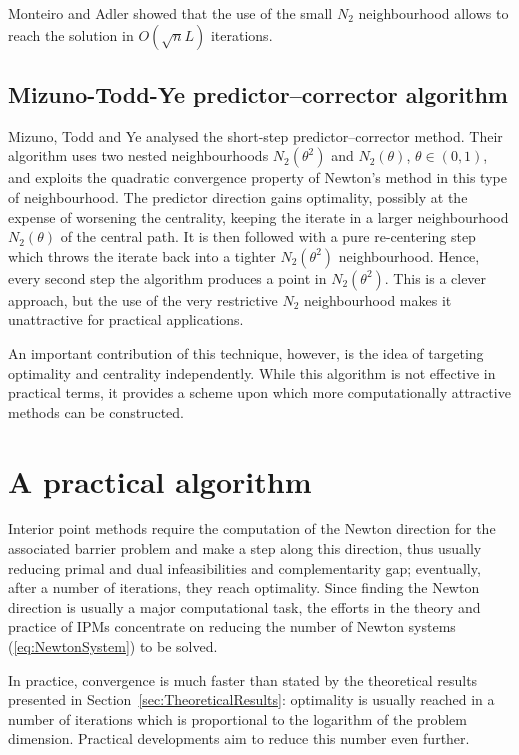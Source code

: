 Monteiro and Adler \cite{MonteiroAdler89a} showed that the use of
the small $N_2$ neighbourhood allows to reach the solution in
$O(\sqrt{n}L)$ iterations.


%
%
\subsection{Mizuno-Todd-Ye predictor--corrector algorithm}

Mizuno, Todd and Ye \cite{MizunoToddYe} analysed the short-step 
predictor--corrector method. Their algorithm uses two nested neighbourhoods 
$N_2(\theta^2)$ and $N_2(\theta)$, $\theta \in (0,1)$, and exploits the
quadratic convergence property of Newton's method in this type of 
neighbourhood.
The predictor direction gains optimality, possibly at the expense of
worsening the centrality, keeping the iterate in a larger neighbourhood
$N_2(\theta)$ of the central path. It is then followed with a 
pure re-centering step which throws the iterate back into a 
tighter $N_2(\theta^2)$ neighbourhood. Hence, every second step the 
algorithm produces a point in $N_2(\theta^2)$. This is a clever 
approach, but the use of the very restrictive $N_2$ neighbourhood 
makes it unattractive for practical applications.

An important contribution of this technique, however, is the idea 
of targeting optimality and centrality independently. While this 
algorithm is not effective in practical terms, it provides a scheme 
upon which more computationally attractive methods can be constructed.


%
%
%
\section{A practical algorithm}

Interior point methods require the computation of the Newton 
direction for the associated barrier problem and make a step along 
this direction, thus usually reducing primal and dual infeasibilities 
and complementarity gap; eventually, after a number of iterations, 
they reach optimality. 
Since finding the Newton direction is usually a major computational task, 
the efforts in the theory and practice of IPMs concentrate on reducing 
the number of Newton systems (\ref{eq:NewtonSystem}) to be solved.

In practice, convergence is much faster than stated by the theoretical
results presented in Section~\ref{sec:TheoreticalResults}: 
optimality is usually reached in a number of iterations which is 
proportional to the logarithm of the problem dimension. Practical 
developments aim to reduce this number even further. 

